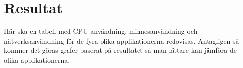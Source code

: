 \section{Resultat}
\label{sec:joel_a-results}

Här ska en tabell med CPU-användning, minnesanvändning och nätverksanvändning för de fyra olika applikationerna redovisas. Antagligen så kommer det göras grafer baserat på resultatet så man lättare kan jämföra de olika applikationerna.
